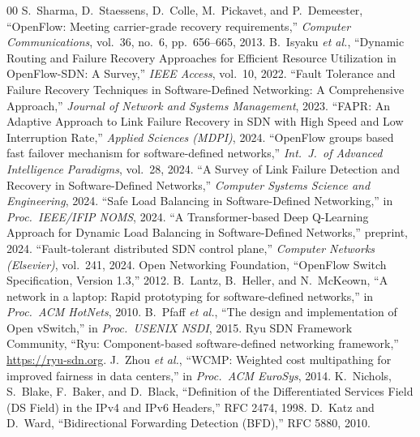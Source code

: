 \documentclass[conference]{IEEEtran}
\begin{document}
\begin{thebibliography}{00}
 S.~Sharma, D.~Staessens, D.~Colle, M.~Pickavet, and P.~Demeester,
``OpenFlow: Meeting carrier-grade recovery requirements,'' \emph{Computer
Communications}, vol.~36, no.~6, pp.~656--665, 2013.
 B.~Isyaku \emph{et al.}, ``Dynamic Routing and Failure Recovery
Approaches for Efficient Resource Utilization in OpenFlow-SDN: A Survey,''
\emph{IEEE Access}, vol.~10, 2022.
 ``Fault Tolerance and Failure Recovery Techniques in
Software-Defined Networking: A Comprehensive Approach,'' \emph{Journal of
Network and Systems Management}, 2023.
 ``FAPR: An Adaptive Approach to Link Failure Recovery in SDN with
High Speed and Low Interruption Rate,'' \emph{Applied Sciences (MDPI)}, 2024.
 ``OpenFlow groups based fast failover mechanism for
software-defined networks,'' \emph{Int.\ J.\ of Advanced Intelligence
Paradigms}, vol.~28, 2024.
 ``A Survey of Link Failure Detection and Recovery in
Software-Defined Networks,'' \emph{Computer Systems Science and Engineering},
2024.
 ``Safe Load Balancing in Software-Defined Networking,'' in
\emph{Proc.\ IEEE/IFIP NOMS}, 2024.
 ``A Transformer-based Deep Q-Learning Approach for Dynamic
Load Balancing in Software-Defined Networks,'' preprint, 2024.
 ``Fault-tolerant distributed SDN control plane,'' \emph{Computer
Networks (Elsevier)}, vol.~241, 2024.
 Open Networking Foundation, ``OpenFlow Switch Specification,
Version 1.3,'' 2012.
 B.~Lantz, B.~Heller, and N.~McKeown, ``A network in a laptop:
Rapid prototyping for software-defined networks,'' in \emph{Proc.\ ACM HotNets},
2010.
 B.~Pfaff \emph{et al.}, ``The design and implementation of Open
vSwitch,'' in \emph{Proc.\ USENIX NSDI}, 2015.
 Ryu SDN Framework Community, ``Ryu: Component-based software-defined
networking framework,'' \url{https://ryu-sdn.org}.
 J.~Zhou \emph{et al.}, ``WCMP: Weighted cost multipathing for
improved fairness in data centers,'' in \emph{Proc.\ ACM EuroSys}, 2014.
 K.~Nichols, S.~Blake, F.~Baker, and D.~Black, ``Definition of
the Differentiated Services Field (DS Field) in the IPv4 and IPv6 Headers,'' RFC
2474, 1998.
 D.~Katz and D.~Ward, ``Bidirectional Forwarding Detection (BFD),''
RFC 5880, 2010.
\end{thebibliography}
\end{document}
